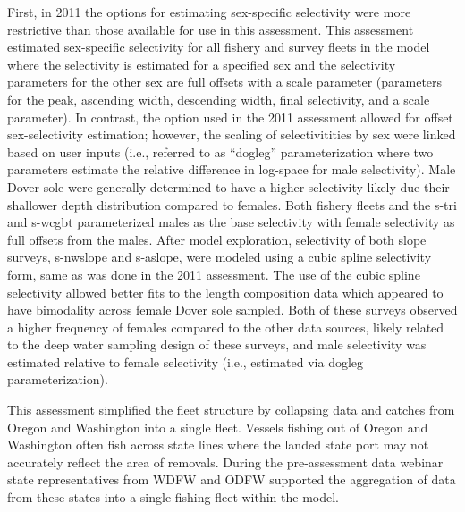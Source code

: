 \documentclass[11pt,
  english,
  a4paper,
]{article}
\begin{document}
First, in 2011 the options for estimating sex-specific selectivity were more restrictive than those available for use in this assessment. This assessment estimated sex-specific selectivity for all fishery and survey fleets in the model where the selectivity is estimated for a specified sex and the selectivity parameters for the other sex are full offsets with a scale parameter (parameters for the peak, ascending width, descending width, final selectivity, and a scale parameter). In contrast, the option used in the 2011 assessment allowed for offset sex-selectivity estimation; however, the scaling of selectivitities by sex were linked based on user inputs (i.e., referred to as ``dogleg'' parameterization where two parameters estimate the relative difference in log-space for male selectivity). Male Dover sole were generally determined to have a higher selectivity likely due their shallower depth distribution compared to females. Both fishery fleets and the \gls{s-tri} and \gls{s-wcgbt} parameterized males as the base selectivity with female selectivity as full offsets from the males. After model exploration, selectivity of both slope surveys, \gls{s-nwslope} and \gls{s-aslope}, were modeled using a cubic spline selectivity form, same as was done in the 2011 assessment. The use of the cubic spline selectivity allowed better fits to the length composition data which appeared to have bimodality across female Dover sole sampled. Both of these surveys observed a higher frequency of females compared to the other data sources, likely related to the deep water sampling design of these surveys, and male selectivity was estimated relative to female selectivity (i.e., estimated via dogleg parameterization).

\leavevmode\tagmcend\tagstructend\par


This assessment simplified the fleet structure by collapsing data and catches from Oregon and Washington into a single fleet. Vessels fishing out of Oregon and Washington often fish across state lines where the landed state port may not accurately reflect the area of removals. During the pre-assessment data webinar state representatives from WDFW and ODFW supported the aggregation of data from these states into a single fishing fleet within the model.

\leavevmode\tagmcend\tagstructend\par

\end{document}
